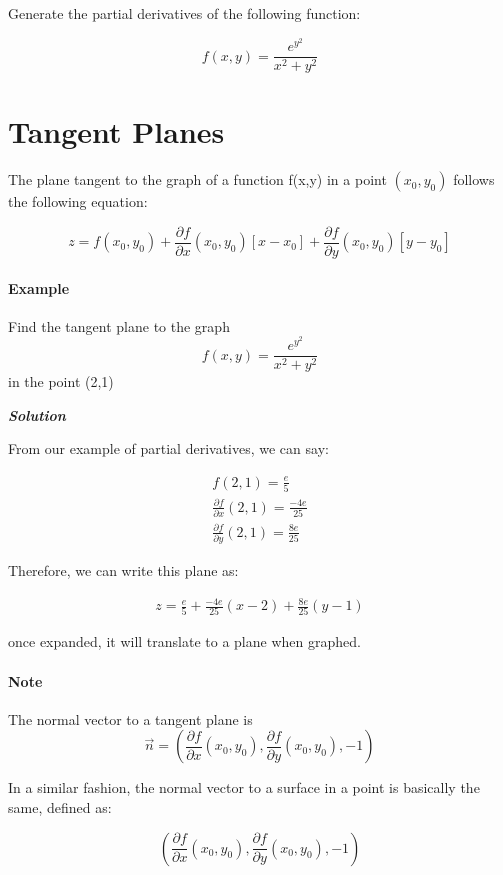 \documentclass[11pt,fleqn]{book} %
\begin{document}
Generate the partial derivatives of the following function:

$$f(x,y) = \frac{e^{y^{2}}}{x^2+y^2}$$

\section{Tangent Planes}

The plane tangent to the graph of a function f(x,y) in a point $(x_0, y_0)$
follows the following equation:

$$z = f(x_0, y_0) + \frac{\partial f}{\partial x} (x_0, y_0) [x - x_0] + \frac{\partial f}{\partial y} (x_0, y_0) [y - y_0] $$

\paragraph{Example}

Find the tangent plane to the graph $$f(x,y) = \frac{e^{y^{2}}}{x^2+y^2}$$ in the point (2,1)

\textit{\textbf{Solution}}

From our example of partial derivatives, we can say:

\begin{gather}
    f(2,1) = \frac{e}{5}\\
    \frac{\partial f}{\partial x} (2,1) =  \frac{-4e}{25}\\
    \frac{\partial f}{\partial y} (2,1) =  \frac{8e}{25}
\end{gather}

Therefore, we can write this plane as:

\begin{gather}
    z = \frac{e}{5} + \frac{-4e}{25}(x - 2) + \frac{8e}{25}(y - 1)
\end{gather}

once expanded, it will translate to a plane when graphed.

\paragraph*{Note}

The normal vector to a tangent plane is $$\vec{n} = (\frac{\partial f}{\partial x} (x_0, y_0), \frac{\partial f}{\partial y} (x_0, y_0), -1)$$

In a similar fashion, the normal vector to a surface in a point is basically the same, defined as:

$$(\frac{\partial f}{\partial x} (x_0, y_0), \frac{\partial f}{\partial y} (x_0, y_0), -1)$$
\end{document}

